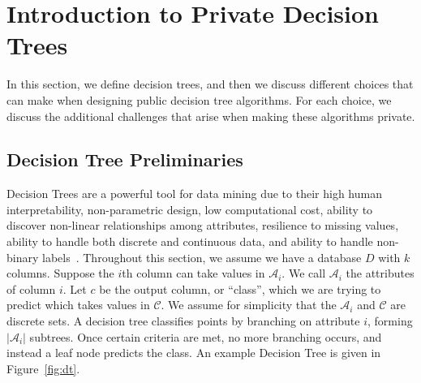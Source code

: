 \documentclass[11pt]{report}
\begin{document}
\section{Introduction to Private Decision Trees}\label{sec:pdtrees}
In this section, we define decision trees, and then we discuss different choices that can make when designing public decision tree algorithms. For each choice, we discuss the additional challenges that arise when making these algorithms private.

\subsection{Decision Tree Preliminaries}
Decision Trees are a powerful tool for data mining due to their high human interpretability, non-parametric design, low computational cost, ability to discover non-linear relationships among attributes, resilience to missing values, ability to handle both discrete and continuous data, and ability to handle non-binary labels~\cite{Fletcher:2016}. Throughout this section, we assume we have a database $D$ with $k$ columns. Suppose the $i$th column can take values in $\mathcal{A}_i$. We call $\mathcal{A}_i$ the attributes of column $i$. Let $c$ be the output column, or ``class'', which we are trying to predict which takes values in $\mathcal{C}$. We assume for simplicity that the $\mathcal{A}_i$ and $\mathcal{C}$ are discrete sets. A decision tree classifies points by branching on attribute $i$, forming $|\mathcal{A}_i|$ subtrees. Once certain criteria are met, no more branching occurs, and instead a leaf node predicts the class. An example Decision Tree is given in Figure~\ref{fig:dt}.
\end{document}
